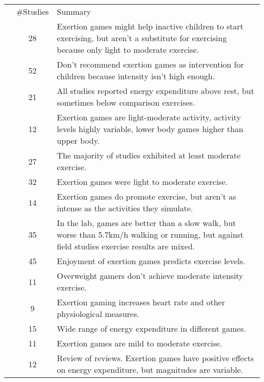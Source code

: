 
\begin{tabularx}{\linewidth}{@{}c@{}cX}
&\#Studies & Summary\\
\cite{Peng2013UsingResearch}& 28 & Exertion games might help inactive children to start exercising, but aren't a substitute for exercising because only light to moderate exercise. \\
\cite{Chaput2013ActiveYouth}& 52 & Don't recommend exertion games as intervention for children because intensity isn't high enough. \\
\cite{LeBlanc2013ActiveReview}& 21 & All studies reported energy expenditure above rest, but sometimes below comparison exercises. \\
\cite{biddiss2010active}&  12 & Exertion games are light-moderate activity, activity levels highly variable, lower body games higher than upper body. \\
\cite{Sween2014TheReview}& 27 & The majority of studies exhibited at least moderate exercise.\\ 
\cite{liang2014effects}& 32 & Exertion games were light to moderate exercise.\\
\cite{daley2009can}& 14 & Exertion games do promote exercise, but aren't as intense as the activities they simulate.\\
\cite{gao2015meta}& 35& In the lab, games are better than a slow walk, but worse than 5.7km/h walking or running, but against field studies exercise results are mixed.\\
\cite{Lee2017TheReview}& 45 & Enjoyment of exertion games predicts exercise levels. \\
\cite{Hchsmann2016EffectsIndividuals}& 11& Overweight gamers don't achieve moderate intensity exercise.\\
\cite{Lamboglia2013ExergamingReview}& 9 & Exertion gaming increases heart rate and other physiological measures.\\
\cite{Whitehead2010ExergameUs} & 15 & Wide range of energy expenditure in different games.\\
\cite{Foley2010UseReality} &11& Exertion games are mild to moderate exercise. \\
\cite{Parisod2014PromotingReviews}& 12 & Review of reviews. Exertion games have positive effects on energy expenditure, but magnitudes are variable. \\

\end{tabularx}

